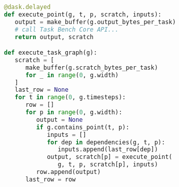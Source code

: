 \begin{lstlisting}[language=Python,caption={Excerpt from Task Bench implementation in Dask.\label{lst:code-sample}},float]
@dask.delayed
def execute_point(g, t, p, scratch, inputs):
   output = make_buffer(g.output_bytes_per_task)
   # call Task Bench Core API...
   return output, scratch

def execute_task_graph(g):
   scratch = [
      make_buffer(g.scratch_bytes_per_task)
      for _ in range(0, g.width)
   ]
   last_row = None
   for t in range(0, g.timesteps):
      row = []
      for p in range(0, g.width):
         output = None
         if g.contains_point(t, p):
            inputs = []
            for dep in dependencies(g, t, p):
               inputs.append(last_row[dep])
            output, scratch[p] = execute_point(
               g, t, p, scratch[p], inputs)
         row.append(output)
      last_row = row
\end{lstlisting}
